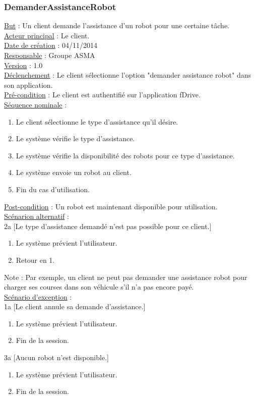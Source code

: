 \subsubsection{DemanderAssistanceRobot}
	\underline{But} : Un client demande l'assistance d'un robot pour une certaine tâche.\\
	\underline{Acteur principal} : Le client.\\
	\underline{Date de création} : 04/11/2014\\
	\underline{Responsable} : Groupe ASMA\\
	\underline{Version} : 1.0\\
	\underline{Déclenchement} : Le client sélectionne l'option "demander assistance robot" dans son application.\\
	\underline{Pré-condition} : Le client est authentifié sur l'application fDrive.\\
	\underline{Séquence nominale} :\\
		\begin{enumerate}
			\item Le client sélectionne le type d'assistance qu'il désire.
			\item Le système vérifie le type d'assistance.
			\item Le système vérifie la disponibilité des robots pour ce type d'assistance.
			\item Le système envoie un robot au client.
			\item Fin du cas d'utilisation.
		\end{enumerate}
	\underline{Post-condition} : Un robot est maintenant disponible pour utilisation.\\
	\underline{Scénarion alternatif} :\\
		2a [Le type d'assistance demandé n'est pas possible pour ce client.]
	 		\begin{enumerate}[label=2a.\arabic* ]
	 			\item Le système prévient l'utilisateur.
	 			\item Retour en 1.
	 		\end{enumerate}
		Note : Par exemple, un client ne peut pas demander une assistance robot pour charger ses courses dans son véhicule s'il n'a pas encore payé.\\
	\underline{Scénario d'exception} :\\
		1a [Le client annule sa demande d'assistance.]
			\begin{enumerate}[label=1a.\arabic* ]
	 			\item Le système prévient l'utilisateur.
	 			\item Fin de la session.
	 		\end{enumerate}
	 	3a [Aucun robot n'est disponible.]
	 		\begin{enumerate}[label=3a.\arabic* ]
	 			\item Le système prévient l'utilisateur.
	 			\item Fin de la session.
	 		\end{enumerate}